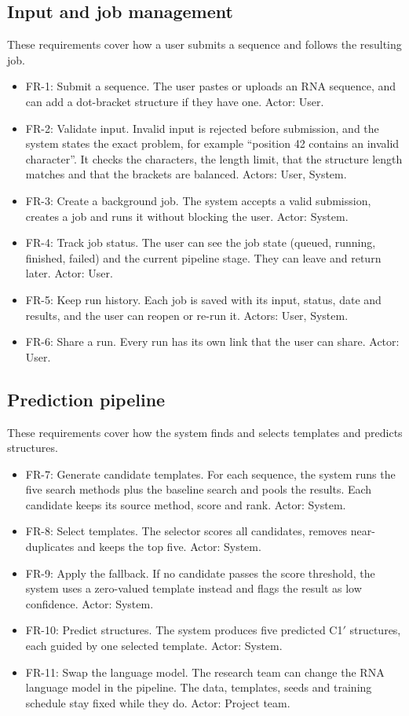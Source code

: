 \documentclass{FastFyp}
\begin{document}
\subsection{Input and job management}
These requirements cover how a user submits a sequence and follows the resulting job.
\begin{itemize}
\item FR-1: Submit a sequence. The user pastes or uploads an RNA sequence, and can add a dot-bracket structure if they have one. Actor: User.
\item FR-2: Validate input. Invalid input is rejected before submission, and the system states the exact problem, for example ``position 42 contains an invalid character''. It checks the characters, the length limit, that the structure length matches and that the brackets are balanced. Actors: User, System.
\item FR-3: Create a background job. The system accepts a valid submission, creates a job and runs it without blocking the user. Actor: System.
\item FR-4: Track job status. The user can see the job state (queued, running, finished, failed) and the current pipeline stage. They can leave and return later. Actor: User.
\item FR-5: Keep run history. Each job is saved with its input, status, date and results, and the user can reopen or re-run it. Actors: User, System.
\item FR-6: Share a run. Every run has its own link that the user can share. Actor: User.
\end{itemize}

\subsection{Prediction pipeline}
These requirements cover how the system finds and selects templates and predicts structures.
\begin{itemize}
\item FR-7: Generate candidate templates. For each sequence, the system runs the five search methods plus the baseline search and pools the results. Each candidate keeps its source method, score and rank. Actor: System.
\item FR-8: Select templates. The selector scores all candidates, removes near-duplicates and keeps the top five. Actor: System.
\item FR-9: Apply the fallback. If no candidate passes the score threshold, the system uses a zero-valued template instead and flags the result as low confidence. Actor: System.
\item FR-10: Predict structures. The system produces five predicted C1$'$ structures, each guided by one selected template. Actor: System.
\item FR-11: Swap the language model. The research team can change the RNA language model in the pipeline. The data, templates, seeds and training schedule stay fixed while they do. Actor: Project team.
\end{itemize}
\end{document}
